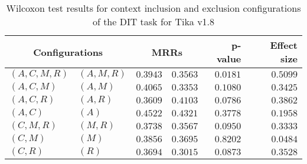 
\begin{table}
\begin{spacing}{1.2}
\centering
\caption{Wilcoxon test results for context inclusion and exclusion configurations of the DIT task for Tika v1.8}
\label{table:versus-wilcox-tika-dit-context}
\begin{tabular}{ll|rr|rr}
\toprule
      \multicolumn{2}{c|}{Configurations} &          \multicolumn{2}{c|}{MRRs} &       p-value & Effect size \\
\midrule
 $(A,C,M,R)$ &  $(A,M,R)$ & $0.3943$ & $0.3563$ & $0.0181$ &    $0.5099$ \\
   $(A,C,M)$ &    $(A,M)$ & $0.4065$ & $0.3353$ & $0.1080$ &    $0.3425$ \\
   $(A,C,R)$ &    $(A,R)$ & $0.3609$ & $0.4103$ & $0.0786$ &    $0.3862$ \\
     $(A,C)$ &      $(A)$ & $0.4522$ & $0.4321$ & $0.3778$ &    $0.1958$ \\
   $(C,M,R)$ &    $(M,R)$ & $0.3738$ & $0.3567$ & $0.0950$ &    $0.3333$ \\
     $(C,M)$ &      $(M)$ & $0.3856$ & $0.3695$ & $0.8202$ &    $0.0484$ \\
     $(C,R)$ &      $(R)$ & $0.3694$ & $0.3015$ & $0.0873$ &    $0.3528$ \\
\bottomrule
\end{tabular}

\end{spacing}
\end{table}

